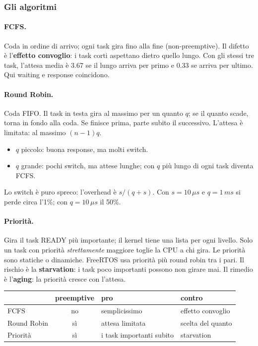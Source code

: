 \subsubsection*{Gli algoritmi}
\paragraph*{FCFS.} Coda in ordine di arrivo; ogni task gira fino alla fine (non-preemptive). Il difetto è l'\textbf{effetto convoglio}: i task corti aspettano dietro quello lungo. Con gli stessi tre task, l'attesa media è 3.67 se il lungo arriva per primo e 0.33 se arriva per ultimo. Qui waiting e response coincidono.

\paragraph*{Round Robin.} Coda FIFO. Il task in testa gira al massimo per un quanto $q$; se il quanto scade, torna in fondo alla coda. Se finisce prima, parte subito il successivo. L'attesa è limitata: al massimo $(n-1)q$.
\begin{itemize}
    \item $q$ piccolo: buona response, ma molti switch.
    \item $q$ grande: pochi switch, ma attese lunghe; con $q$ più lungo di ogni task diventa FCFS.
\end{itemize}
Lo switch è puro spreco: l'overhead è $s/(q+s)$. Con $s=10\,\mu s$ e $q=1\,ms$ si perde circa l'1\%; con $q=10\,\mu s$ il 50\%.

\paragraph*{Priorità.} Gira il task READY più importante; il kernel tiene una lista per ogni livello. Solo un task con priorità \emph{strettamente} maggiore toglie la CPU a chi gira. Le priorità sono statiche o dinamiche. FreeRTOS usa priorità più round robin tra i pari. Il rischio è la \textbf{starvation}: i task poco importanti possono non girare mai. Il rimedio è l'\textbf{aging}: la priorità cresce con l'attesa.

\begin{center}
    \begin{tabular}{l c l l}
        \hline
        & \textbf{preemptive} & \textbf{pro} & \textbf{contro} \\
        \hline
        FCFS & no & semplicissimo & effetto convoglio \\
        Round Robin & sì & attesa limitata & scelta del quanto \\
        Priorità & sì & i task importanti subito & starvation \\
        \hline
    \end{tabular}
\end{center}

